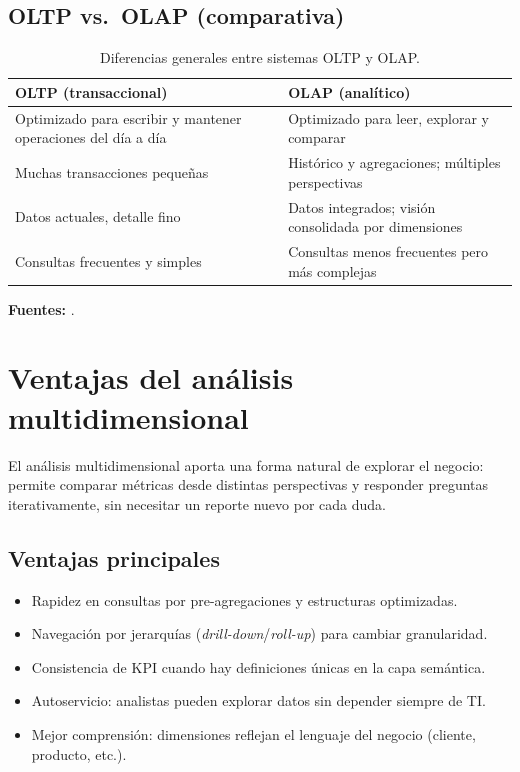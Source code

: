 \documentclass[12pt]{article}
\begin{document}
\subsection*{OLTP vs.\ OLAP (comparativa)}
\begin{table}[h!]
\centering
\begin{tabular}{@{}p{6.2cm}p{6.2cm}@{}}
\toprule
\textbf{OLTP (transaccional)} & \textbf{OLAP (analítico)} \\
\midrule
Optimizado para escribir y mantener operaciones del día a día & Optimizado para leer, explorar y comparar \\
Muchas transacciones pequeñas & Histórico y agregaciones; múltiples perspectivas \\
Datos actuales, detalle fino & Datos integrados; visión consolidada por dimensiones \\
Consultas frecuentes y simples & Consultas menos frecuentes pero más complejas \\
\bottomrule
\end{tabular}
\caption{Diferencias generales entre sistemas OLTP y OLAP.}
\end{table}

\noindent\textbf{Fuentes:} \cite{ibm_olap, g4g_olap_ops}.

\section{Ventajas del análisis multidimensional}
El análisis multidimensional aporta una forma natural de explorar el negocio: permite comparar métricas desde distintas perspectivas y responder preguntas iterativamente, sin necesitar un reporte nuevo por cada duda.

\subsection*{Ventajas principales}
\begin{itemize}[leftmargin=*, itemsep=0.25em]
  \item Rapidez en consultas por pre-agregaciones y estructuras optimizadas.
  \item Navegación por jerarquías (\textit{drill-down}/\textit{roll-up}) para cambiar granularidad.
  \item Consistencia de KPI cuando hay definiciones únicas en la capa semántica.
  \item Autoservicio: analistas pueden explorar datos sin depender siempre de TI.
  \item Mejor comprensión: dimensiones reflejan el lenguaje del negocio (cliente, producto, etc.).
\end{itemize}
\end{document}
